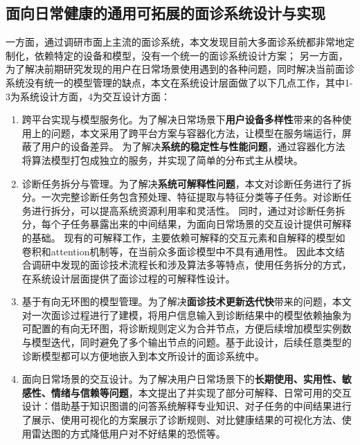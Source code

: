\subsection{面向日常健康的通用可拓展的面诊系统设计与实现}
一方面，通过调研市面上主流的面诊系统，本文发现目前大多面诊系统都非常地定制化，依赖特定的设备和模型，没有一个统一的面诊系统设计方案；
另一方面，为了解决前期研究发现的用户在日常场景使用遇到的各种问题，同时解决当前面诊系统没有统一的模型管理的缺点，本文在系统设计层面做了以下几点工作，其中1-3为系统设计方面，4为交互设计方面：
\begin{enumerate}
\item 跨平台实现与模型服务化。为了解决日常场景下\textbf{用户设备多样性}带来的各种使用上的问题，本文采用了跨平台方案与容器化方法，让模型在服务端运行，屏蔽了用户的设备差异。
    为了解决\textbf{系统的稳定性与性能问题}，通过容器化方法将算法模型打包成独立的服务，并实现了简单的分布式主从模块。

    \item 诊断任务拆分与管理。为了解决\textbf{系统可解释性问题}，本文对诊断任务进行了拆分。一次完整诊断任务包含预处理、特征提取与特征分类等子任务。对诊断任务进行拆分，可以提高系统资源利用率和灵活性。
    同时，通过对诊断任务拆分，每个子任务暴露出来的中间结果，为面向日常场景的交互设计提供可解释的基础。
    现有的可解释工作，主要依赖可解释的交互元素和自解释的模型如卷积和attention机制等\cite{abdul2018trends}，在当前众多面诊模型中不具有通用性。
    因此本文结合调研中发现的面诊技术流程长和涉及算法多等特点，使用任务拆分的方式，在系统设计层面提供了面诊过程的可解释性设计。

    \item 基于有向无环图的模型管理。为了解决\textbf{面诊技术更新迭代快}带来的问题，本文对一次面诊过程进行了建模，将用户信息输入到诊断结果中的模型依赖抽象为可配置的有向无环图，将诊断规则定义为合并节点，方便后续增加模型实例数与模型迭代，同时避免了多个输出节点的问题。基于此设计，后续任意类型的诊断模型都可以方便地嵌入到本文所设计的面诊系统中。
    
    \item 面向日常场景的交互设计。为了解决用户日常场景下的\textbf{长期使用、实用性、敏感性、情绪与信赖等问题}，本文提出了并实现了部分可解释、日常可用的交互设计：借助基于知识图谱的问答系统解释专业知识、对子任务的中间结果进行了展示、使用可视化的方案展示了诊断规则、对比健康结果的可视化方法、使用雷达图的方式降低用户对不好结果的恐慌等。
\end{enumerate}

